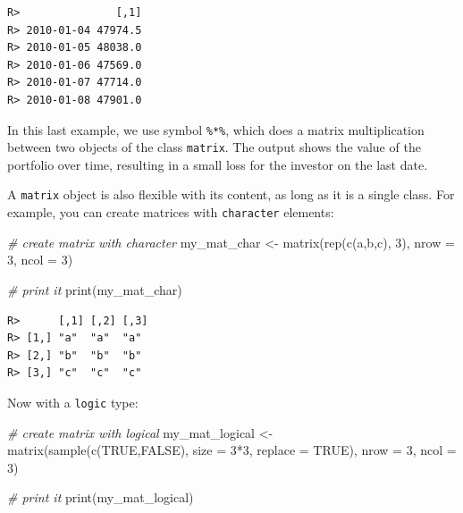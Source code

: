 \documentclass[
  12pt,
]{book}
\newenvironment{Shaded}{\begin{snugshade}}{\end{snugshade}}
\newcommand{\AttributeTok}[1]{\textcolor[rgb]{0.61,0.61,0.61}{#1}}
\newcommand{\CommentTok}[1]{\textcolor[rgb]{0.37,0.37,0.37}{\textit{#1}}}
\newcommand{\ConstantTok}[1]{\textcolor[rgb]{0,0,0}{#1}}
\newcommand{\DecValTok}[1]{\textcolor[rgb]{0.06,0.06,0.06}{#1}}
\newcommand{\FunctionTok}[1]{\textcolor[rgb]{0,0,0}{#1}}
\newcommand{\NormalTok}[1]{#1}
\newcommand{\OtherTok}[1]{\textcolor[rgb]{0.37,0.37,0.37}{#1}}
\newcommand{\SpecialCharTok}[1]{\textcolor[rgb]{0,0,0}{#1}}
\newcommand{\StringTok}[1]{\textcolor[rgb]{0.5,0.5,0.5}{#1}}
\begin{document}
\begin{verbatim}
R>               [,1]
R> 2010-01-04 47974.5
R> 2010-01-05 48038.0
R> 2010-01-06 47569.0
R> 2010-01-07 47714.0
R> 2010-01-08 47901.0
\end{verbatim}

In this last example, we use symbol \texttt{\%*\%}, which does a matrix multiplication between two objects of the class \texttt{matrix}. The output shows the value of the portfolio over time, resulting in a small loss for the investor on the last date.  

A \texttt{matrix} object is also flexible with its content, as long as it is a single class. For example, you can create matrices with \texttt{character} elements:

\begin{Shaded}
\begin{Highlighting}[]
\CommentTok{\# create matrix with character}
\NormalTok{my\_mat\_char }\OtherTok{\textless{}{-}} \FunctionTok{matrix}\NormalTok{(}\FunctionTok{rep}\NormalTok{(}\FunctionTok{c}\NormalTok{(}\StringTok{\textquotesingle{}a\textquotesingle{}}\NormalTok{,}\StringTok{\textquotesingle{}b\textquotesingle{}}\NormalTok{,}\StringTok{\textquotesingle{}c\textquotesingle{}}\NormalTok{), }\DecValTok{3}\NormalTok{), }
                      \AttributeTok{nrow =} \DecValTok{3}\NormalTok{, }
                      \AttributeTok{ncol =} \DecValTok{3}\NormalTok{)}

\CommentTok{\# print it                    }
\FunctionTok{print}\NormalTok{(my\_mat\_char)}
\end{Highlighting}
\end{Shaded}

\begin{verbatim}
R>      [,1] [,2] [,3]
R> [1,] "a"  "a"  "a" 
R> [2,] "b"  "b"  "b" 
R> [3,] "c"  "c"  "c"
\end{verbatim}

Now with a \texttt{logic} type:

\begin{Shaded}
\begin{Highlighting}[]
\CommentTok{\# create matrix with logical}
\NormalTok{my\_mat\_logical }\OtherTok{\textless{}{-}} \FunctionTok{matrix}\NormalTok{(}\FunctionTok{sample}\NormalTok{(}\FunctionTok{c}\NormalTok{(}\ConstantTok{TRUE}\NormalTok{,}\ConstantTok{FALSE}\NormalTok{), }
                                \AttributeTok{size =} \DecValTok{3}\SpecialCharTok{*}\DecValTok{3}\NormalTok{,}
                                \AttributeTok{replace =} \ConstantTok{TRUE}\NormalTok{),}
                         \AttributeTok{nrow =} \DecValTok{3}\NormalTok{, }
                         \AttributeTok{ncol =} \DecValTok{3}\NormalTok{)}

\CommentTok{\# print it                    }
\FunctionTok{print}\NormalTok{(my\_mat\_logical)}
\end{Highlighting}
\end{Shaded}
\end{document}
